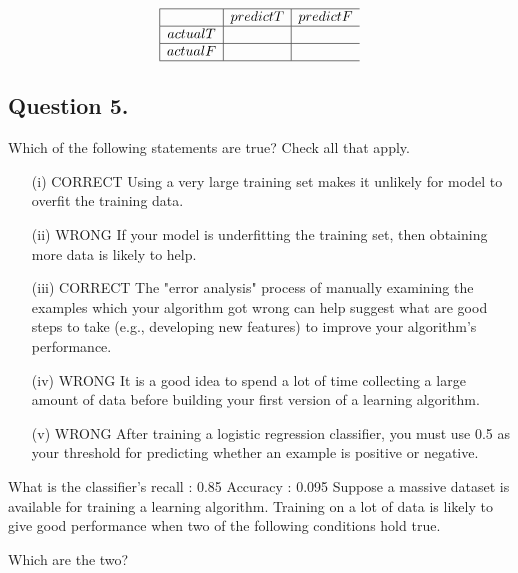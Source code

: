 \documentclass[11pt]{article} %
\begin{document}
\[\begin{array}{|c|c|c} \hline 
&   predict T	& predict F\\ \hline
actual T &	&  \\ \hline 
actual F & &  \\ \hline
\end{array} \]


\subsection*{Question 5.}

Which of the following statements are true? Check all that apply.

\begin{itemize}
\item[(i)] CORRECT Using a very large training set makes it unlikely for model to overfit the training data.
	
	
\item[(ii)] 	WRONG If your model is underfitting the training set, then obtaining more data is likely to help.
	
\item[(iii)] 	CORRECT The "error analysis" process of manually examining the examples which your algorithm got wrong	can help suggest what are good steps to take (e.g., developing new features) to improve your algorithm's performance.
	
	
	
\item[(iv)]	WRONG It is a good idea to spend a lot of time collecting a large amount of data before building your first version of a learning algorithm.
	
	
	
\item[(v)] WRONG After training a logistic regression classifier, you must use 0.5 as your threshold for predicting whether an example is positive or	negative.
\end{itemize}


\newpage

What is the classifier's recall  : 0.85
Accuracy : 0.095
Suppose a massive dataset is available for training a learning algorithm. Training on a lot of data is likely to give good performance when two of the following conditions hold true.

Which are the two?
\end{document}
